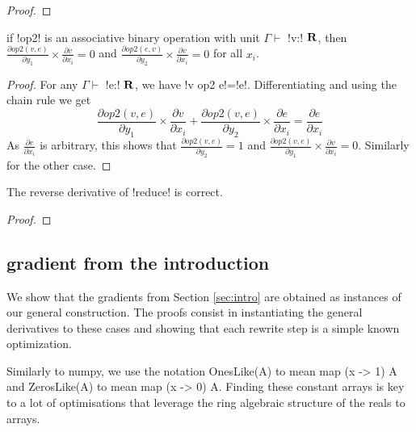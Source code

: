 \begin{proof}
    
\end{proof}

\begin{lemma}
    if !op2! is an associative binary operation with unit $\Gamma \vdash$ !v:! $\mathbf{R}$, then 
    $\frac{\partial op2(v,e)}{\partial y_1}\times\frac{\partial v}{\partial x_i}=0$ 
    and $\frac{\partial op2(e,v)}{\partial y_2}\times\frac{\partial v}{\partial x_i}=0$ for all $x_i$.
\end{lemma}

\begin{proof}
    For any $\Gamma \vdash$ !e:! $\mathbf{R}$, we have !v op2 e!=!e!.
    Differentiating and using the chain rule we get 
    $$\frac{\partial op2(v,e)}{\partial y_1}\times\frac{\partial v}{\partial x_i}
    +\frac{\partial op2(v,e)}{\partial y_2}\times\frac{\partial e}{\partial x_i}
    = \frac{\partial e}{\partial x_i}$$
As $\frac{\partial e}{\partial x_i}$ is arbitrary, 
this shows that $\frac{\partial op2(v,e)}{\partial y_2}=1$ and $\frac{\partial op2(v,e)}{\partial y_1}\times\frac{\partial v}{\partial x_i}=0$.
Similarly for the other case.
\end{proof}

\begin{proposition}
    The reverse derivative of !reduce! is correct.
\end{proposition}

\begin{proof}
    
\end{proof}

\subsection{gradient from the introduction}
\label{sub:gradintro}

We show that the gradients from Section \ref{sec:intro} are obtained as instances of our general construction. 
The proofs consist in instantiating the general derivatives to these cases 
and showing that each rewrite step is a simple known optimization.

Similarly to numpy, we use the notation OnesLike(A) to mean map (x -> 1) A 
and ZerosLike(A) to mean map (x -> 0) A. 
Finding these constant arrays is key to a lot of optimisations that leverage the ring algebraic structure of the reals to arrays.


